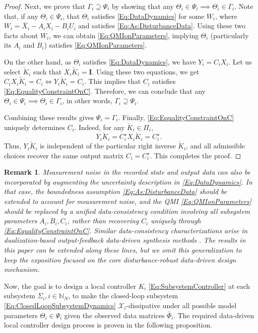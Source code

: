 \documentclass[letterpaper, 10 pt, conference]{ieeeconf}%
\newcommand{\N}{\mathbb{N}}
\newcommand{\I}{\mathbf{I}}
\newcommand{\0}{\mathbf{0}}
\newcommand{\X}{\mathcal{X}}
\newtheorem{remark}{\textbf{Remark}}
\begin{document}
\begin{proof}
Next, we prove that $\Gamma_i \supseteq \Psi_i$ by showing that any $\Theta_i \in \Psi_i \implies \Theta_i \in \Gamma_i$. Note that, if any $\Theta_i \in \Psi_i$, that $\Theta_i$ satisfies \eqref{Eq:DataDynamics} for some $W_i$, where $W_i = \bar{X}_i - A_i X_i - B_i U_i$ and satisfies \eqref{Eq:As:DisturbanceData}. Using these two facts about $W_i$, we can obtain \eqref{Eq:QMIonParameters}, implying $\Theta_i$ (particularly its $A_i$ and $B_i$) satisfies \eqref{Eq:QMIonParameters}. 

On the other hand, as $\Theta_i$ satisfies \eqref{Eq:DataDynamics}, we have $Y_i = C_i X_i$. Let us select $\check{K}_i$ such that $X_i \check{K}_i = \I$. Using these two equations, we get $C_iX_i \check{K}_i = C_i \iff Y_i\check{K}_i = C_i$. This implies that $C_i$ satisfies \eqref{Eq:EqualityConstraintOnC}. Therefore, we can conclude that any $\Theta_i \in \Psi_i \implies \Theta_i \in \Gamma_i$, in other words, $\Gamma_i \supseteq \Psi_i$.

Combining these results gives $\Psi_i=\Gamma_i$. Finally, \eqref{Eq:EqualityConstraintOnC} uniquely determines $C_i$. Indeed, for any $\check K_i\in\Pi_i$,
\[
Y_i\check K_i=C_i^\star X_i\check K_i=C_i^\star.
\]
Thus, $Y_i\check K_i$ is independent of the particular right inverse $\check K_i$, and all admissible choices recover the same output matrix $C_i=C_i^\star$. This completes the proof.
\end{proof}


\begin{remark}
Measurement noise in the recorded state and output data can also be incorporated by augmenting the uncertainty description in \eqref{Eq:DataDynamics}. In that case, the boundedness assumption \eqref{Eq:As:DisturbanceData} should be extended to account for measurement noise, and the QMI \eqref{Eq:QMIonParameters} should be replaced by a unified data-consistency condition involving all subsystem parameters $A_i,B_i,C_i$, rather than recovering $C_i$ uniquely through \eqref{Eq:EqualityConstraintOnC}. Similar data-consistency characterizations arise in dualization-based output-feedback data-driven synthesis methods \cite{kristovic2024output}. The results in this paper can be extended along these lines, but we omit this generalization to keep the exposition focused on the core disturbance-robust data-driven design mechanism.
\end{remark}

Now, the goal is to design a local controller $K_i$ \eqref{Eq:SubsystemController} at each subsystem $\Sigma_i, i\in\N_N$, to make the closed-loop subsystem \eqref{Eq:ClosedLoopSubsystemDynamics} $\X_i$-dissipative under all possible model parameters $\Theta_i \in \Psi_i$ given the observed data matrices $\bar{\Phi}_i$. The required data-driven local controller design process is proven in the following proposition.
 
\end{document}
